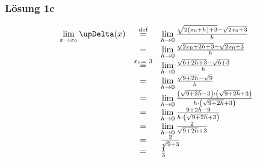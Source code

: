 \documentclass[main.tex]{subfiles}
\begin{document}
\subsubsection*{Lösung 1c}
\begin{equation*}
    \begin{array}{ c c l }
    \lim\limits _{x\rightarrow x_{0}} \upDelta ( x) & \eqdef  & \lim\limits _{h\rightarrow 0}\frac{\sqrt{2( x_{0} +h) +3} -\sqrt{2x_{0} +3}}{h}\\
    & = & \lim\limits _{h\rightarrow 0}\frac{\sqrt{2x_{0} +2h+3} -\sqrt{2x_{0} +3}}{h}\\
    & \overset{x_{0} =\ 3}{=} & \lim\limits _{h\rightarrow 0}\frac{\sqrt{6+2h+3} -\sqrt{6+3}}{h}\\
    & = & \lim\limits _{h\rightarrow 0}\frac{\sqrt{9+2h} -\sqrt{9}}{h}\\
    & = & \lim\limits _{h\rightarrow 0}\frac{\left(\sqrt{9+2h} -3\right) \cdotp \left(\sqrt{9+2h} +3\right)}{h\cdotp \left(\sqrt{9+2h} +3\right)}\\
    & = & \lim\limits _{h\rightarrow 0}\frac{9+2h-9}{h\cdotp \left(\sqrt{9+2h} +3\right)}\\
    & = & \lim\limits _{h\rightarrow 0}\frac{2}{\sqrt{9+2h} +3}\\
    & = & \frac{2}{\sqrt{9} +3}\\
    & = & \frac{1}{3}
    \end{array}
\end{equation*}
\end{document}
